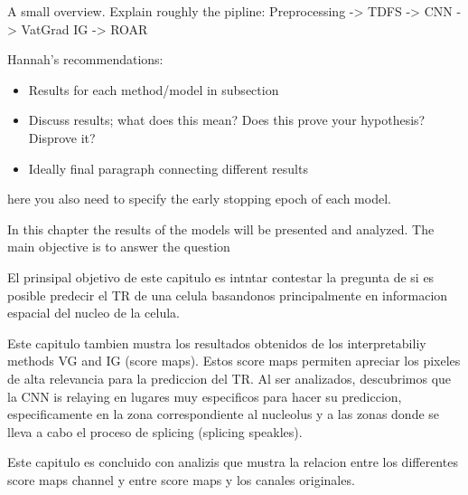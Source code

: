 A small overview. Explain roughly the pipline: Preprocessing -> TDFS -> CNN -> VatGrad IG -> ROAR

Hannah's recommendations:
\begin{itemize}
  \item Results for each method/model in subsection
  \item Discuss results; what does this mean? Does this prove your hypothesis? Disprove it?
  \item Ideally final paragraph connecting different results
\end{itemize}

here you also need to specify the early stopping epoch of each model.

In this chapter the results of the models will be presented and analyzed. The main objective is to answer the question

El prinsipal objetivo de este capitulo es intntar contestar la pregunta de si es posible predecir el TR de una celula basandonos principalmente en informacion espacial del nucleo de la celula.

Este capitulo tambien mustra los resultados obtenidos de los interpretabiliy methods VG and IG (score maps). Estos score maps permiten apreciar los pixeles de alta relevancia para la prediccion del TR. Al ser analizados, descubrimos que la CNN is relaying en lugares muy especificos para hacer su prediccion, especificamente en la zona correspondiente al nucleolus y a las zonas donde se lleva a cabo el proceso de splicing (splicing speakles).

Este capitulo es concluido con analizis que mustra la relacion entre los differentes score maps channel y entre score maps y los canales originales.
